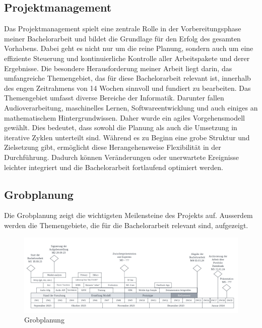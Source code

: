 \documentclass[main.tex]{subfiles} %
\begin{document}
\subsection{Projektmanagement}

Das Projektmanagement spielt eine zentrale Rolle in der Vorbereitungsphase meiner Bachelorarbeit 
und bildet die Grundlage für den Erfolg des gesamten Vorhabens. Dabei geht es nicht nur um die 
reine Planung, sondern auch um eine effiziente Steuerung und kontinuierliche Kontrolle aller 
Arbeitspakete und derer Ergebnisse. Die besondere Herausforderung meiner Arbeit liegt darin, 
das umfangreiche Themengebiet, das für diese Bachelorarbeit relevant ist, innerhalb des engen 
Zeitrahmens von 14 Wochen sinnvoll und fundiert zu bearbeiten. Das Themengebiet umfasst diverse 
Bereiche der Informatik. Darunter fallen Audioverarbeitung, maschinelles Lernen, 
Softwareentwicklung und auch einiges an mathematischem Hintergrundwissen. Daher wurde ein agiles 
Vorgehensmodell gewählt. Dies bedeutet, dass sowohl die Planung als auch die Umsetzung in iterative 
Zyklen unterteilt sind. Während es zu Beginn eine grobe Struktur und Zielsetzung gibt, ermöglicht 
diese Herangehensweise Flexibilität in der Durchführung. Dadurch können Veränderungen oder 
unerwartete Ereignisse leichter integriert und die Bachelorarbeit fortlaufend optimiert werden.

\subsection{Grobplanung}
Die Grobplanung zeigt die wichtigsten Meilensteine des Projekts auf. Ausserdem werden die 
Themengebiete, die für die Bachelorarbeit relevant sind, aufgezeigt.

\begin{figure}[h]
    \hspace{-0.075\linewidth} %
    \includegraphics[width=1.15\linewidth]{img/projectplan.pdf}
    \caption{Grobplanung}
    \label{fig:grobplanung}
\end{figure}
\end{document}
